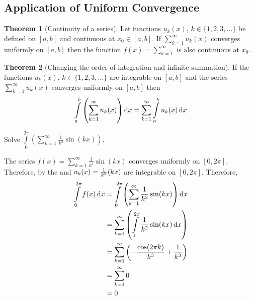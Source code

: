 \documentclass[fleqn, a4paper, 12pt, twoside]{article}
\theoremstyle{definition}
\theoremstyle{theorem}
\newtheorem{theorem}{Theorem}
\begin{document}
{\subsection{Application of Uniform Convergence}

\begin{theorem}[Continuity of a series]
	Let functions $u_k(x)$, $k \in \{1, 2, 3, \dots\}$ be defined on $[a,b]$ and continuous at $x_0 \in [a,b]$.
	If $\sum\limits_{k = 1}^{\infty} u_k(x)$ converges uniformly on $[a,b]$ then the function $f(x) = \sum\limits_{k = 1}^{\infty}$ is also continuous at $x_0$.
\end{theorem}

\begin{theorem}[Changing the order of integration and infinite summation]
	If the functions $u_k(x)$, $k \in \{1, 2, 3, \dots\}$ are integrable on $[a,b]$ and the series $\sum\limits_{k = 1}^{\infty} u_k(x)$ converges uniformly on $[a,b]$ then
	\begin{equation*}
		\int\limits_{a}^{b} \left( \sum\limits_{k = 1}^{\infty} u_k(x) \right) \dif x = \sum\limits_{k = 1}^{\infty} \int\limits_{a}^{b} u_k(x) \dif x
	\end{equation*}
\end{theorem}

\begin{question}
	Solve $\int\limits_{0}^{2 \pi} \left( \sum\limits_{k = 1}^{\infty} \frac{1}{k^2} \sin(k x) \right)$.
\end{question}

\begin{solution}
	The series $f(x) = \sum\limits_{k = 1}^{\infty} \frac{1}{k^2} \sin(k x)$ converges uniformly on $[0, 2 \pi]$.
	Therefore, by the  and $u_k(x) = \frac{1}{k^2} \si(k x)$ are integrable on $[0, 2 \pi]$.
	Therefore,
	\begin{align*}
		\int\limits_{0}^{2 \pi} f(x) \dif x &= \int\limits_{0}^{2 \pi} \left( \sum\limits_{k = 1}^{\infty} \frac{1}{k^2} \sin(k x) \right) \dif x\\
		&= \sum\limits_{k = 1}^{\infty} \left( \int\limits_{0}^{2 \pi} \frac{1}{k^2} \sin(k x) \dif x \right)\\
		&= \sum\limits_{k = 1}^{\infty} \left( -\frac{\cos(2 \pi k)}{k^3} + \frac{1}{k^3} \right)\\
		&= \sum\limits_{k = 1}^{\infty} 0\\
		&= 0
	\end{align*}
\end{solution}

}
\end{document}

